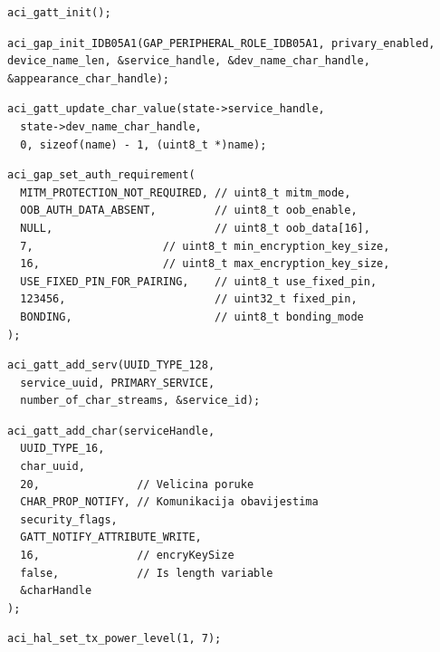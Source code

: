 \documentclass[times, utf8, diplomski]{diplomski}
\begin{document}
\begin{lstlisting}[caption={Inicijaliziraj GATT podsustav}]
aci_gatt_init();
\end{lstlisting}

\begin{lstlisting}[caption={Inicijaliziraj GAP podsustav}]
aci_gap_init_IDB05A1(GAP_PERIPHERAL_ROLE_IDB05A1, privary_enabled, device_name_len, &service_handle, &dev_name_char_handle, &appearance_char_handle);
\end{lstlisting}

\begin{lstlisting}[caption={Postavi ime kojim će se predstavljati ostalim Bluetooth uređajima.}]
aci_gatt_update_char_value(state->service_handle,
  state->dev_name_char_handle,
  0, sizeof(name) - 1, (uint8_t *)name);
\end{lstlisting}

\begin{lstlisting}[caption={Postavi autentifikacijske zahtjeve}]
aci_gap_set_auth_requirement(
  MITM_PROTECTION_NOT_REQUIRED, // uint8_t mitm_mode,
  OOB_AUTH_DATA_ABSENT,         // uint8_t oob_enable,
  NULL,                         // uint8_t oob_data[16],
  7,                    // uint8_t min_encryption_key_size,
  16,                   // uint8_t max_encryption_key_size,
  USE_FIXED_PIN_FOR_PAIRING,    // uint8_t use_fixed_pin,
  123456,                       // uint32_t fixed_pin,
  BONDING,                      // uint8_t bonding_mode
);
\end{lstlisting}

\begin{lstlisting}[caption={Postavljanje servisa koji sadrži karakteristične tokove}]
aci_gatt_add_serv(UUID_TYPE_128,
  service_uuid, PRIMARY_SERVICE,
  number_of_char_streams, &service_id);
\end{lstlisting}

\begin{lstlisting}[caption={Postavljanje karakterističnih tokova}]
aci_gatt_add_char(serviceHandle,
  UUID_TYPE_16,
  char_uuid,
  20,               // Velicina poruke
  CHAR_PROP_NOTIFY, // Komunikacija obavijestima
  security_flags,
  GATT_NOTIFY_ATTRIBUTE_WRITE,
  16,               // encryKeySize
  false,            // Is length variable
  &charHandle
);
\end{lstlisting}

\begin{lstlisting}[caption={Postavi snagu odašiljača}]
aci_hal_set_tx_power_level(1, 7);
\end{lstlisting}
\end{document}
